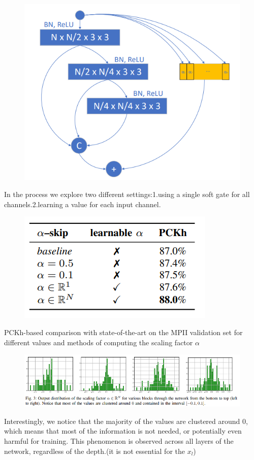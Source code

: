 \documentclass[11pt]{article}
\begin{document}
\begin{figure}[H]
	\centering
	\includegraphics[scale = 0.5]{60}
\end{figure}

In the process we explore two different settings:1.using a single soft gate for all channels.2.learning a value for each input channel.

\begin{figure}[H]
	\centering
	\includegraphics[scale = 0.5]{61}
\end{figure}
PCKh-based comparison with state-of-the-art on the MPII validation set for different values and methods of computing the scaling factor $\alpha$

\begin{figure}[H]
	\centering
	\includegraphics[scale = 0.5]{62}
\end{figure}
Interestingly, we notice that the majority of the values are clustered around
0, which means that most of the information is not needed, or potentially even harmful for training. This phenomenon is observed across all layers of the network, regardless of
the depth.(it is not essential for the $x_l$)
\end{document}
